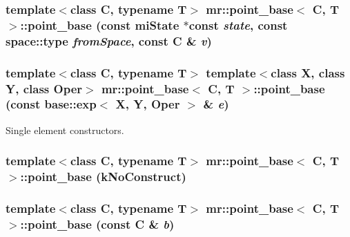 \subsubsection{\setlength{\rightskip}{0pt plus 5cm}template$<$class C, typename T$>$ {\bf mr::point\_\-base}$<$ C, T $>$::{\bf point\_\-base} (const mi\-State $\ast$const {\em state}, const {\bf space::type} {\em from\-Space}, const C \& {\em v})\hspace{0.3cm}{\tt  [inline]}}\label{structmr_1_1point__base_z75_3}


\subsubsection{\setlength{\rightskip}{0pt plus 5cm}template$<$class C, typename T$>$ template$<$class X, class Y, class Oper$>$ {\bf mr::point\_\-base}$<$ C, T $>$::{\bf point\_\-base} (const {\bf base::exp}$<$ X, Y, Oper $>$ \& {\em e})\hspace{0.3cm}{\tt  [inline]}}\label{structmr_1_1point__base_z75_4}


Single element constructors. 

\subsubsection{\setlength{\rightskip}{0pt plus 5cm}template$<$class C, typename T$>$ {\bf mr::point\_\-base}$<$ C, T $>$::{\bf point\_\-base} ({\bf k\-No\-Construct})\hspace{0.3cm}{\tt  [inline]}}\label{structmr_1_1point__base_z75_5}


\subsubsection{\setlength{\rightskip}{0pt plus 5cm}template$<$class C, typename T$>$ {\bf mr::point\_\-base}$<$ C, T $>$::{\bf point\_\-base} (const C \& {\em b})\hspace{0.3cm}{\tt  [inline]}}\label{structmr_1_1point__base_z75_6}


